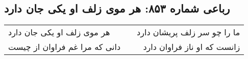 \begin{center}
\section*{رباعی شماره ۸۵۳: هر موی زلف او یکی جان دارد}
\label{sec:0853}
\begin{longtable}{l p{0.5cm} r}
هر موی زلف او یکی جان دارد
&&
ما را چو سر زلف پریشان دارد
\\
دانی که مرا غم فراوان از چیست
&&
زانست که او ناز فراوان دارد
\\
\end{longtable}
\end{center}
